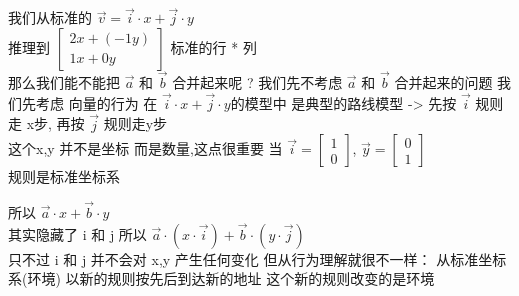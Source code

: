\documentclass[12pt]{article}
\begin{document}
\begin{flushleft}
我们从标准的  $\vec{v} = \vec{i} \cdot x  +  \vec{j} \cdot y $ \\ 
推理到 $\begin{bmatrix}
    2x + (-1y) \\ 
    1x + 0y 
\end{bmatrix}
$ 标准的行 * 列 \\
那么我们能不能把 $\vec{a}$ 和 $\vec{b}$ 合并起来呢 ?
我们先不考虑 $\vec{a}$ 和 $\vec{b}$ 合并起来的问题
我们先考虑 向量的行为 在 $\vec{i} \cdot x  +  \vec{j} \cdot y$的模型中
是典型的路线模型 -> 先按 $\vec{i}$ 规则 走 x步, 再按 $\vec{j}$ 规则走y步 \\ 
这个x,y 并不是坐标 而是数量,这点很重要 
当 $\vec{i}  =  \begin{bmatrix}
    1 \\ 
    0
\end{bmatrix}$, $\vec{y}  =  \begin{bmatrix}
    0 \\ 
    1
\end{bmatrix}$ \\
规则是标准坐标系

所以 $\vec{a} \cdot x  +  \vec{b} \cdot y $ \\ 
其实隐藏了 i 和 j 
所以 $\vec{a} \cdot (x \cdot \vec{i})  +  \vec{b} \cdot (y \cdot \vec{j}) $ \\ 
只不过 i 和 j 并不会对 x,y 产生任何变化
但从行为理解就很不一样：
从标准坐标系(环境) 以新的规则按先后到达新的地址
这个新的规则改变的是环境 
\end{flushleft}
\end{document}
